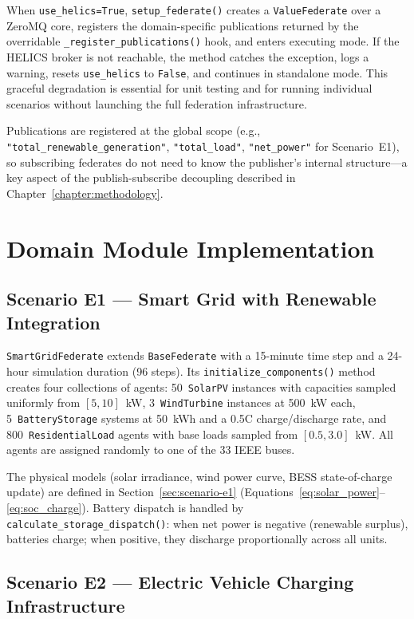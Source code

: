 When \texttt{use\_helics=True}, \texttt{setup\_federate()} creates a \texttt{ValueFederate} over a ZeroMQ core, registers the domain-specific publications returned by the overridable \texttt{\_register\_publications()} hook, and enters executing mode. If the HELICS broker is not reachable, the method catches the exception, logs a warning, resets \texttt{use\_helics} to \texttt{False}, and continues in standalone mode. This graceful degradation is essential for unit testing and for running individual scenarios without launching the full federation infrastructure.

Publications are registered at the global scope (e.g., \texttt{"total\_renewable\_generation"}, \texttt{"total\_load"}, \texttt{"net\_power"} for Scenario~E1), so subscribing federates do not need to know the publisher's internal structure---a key aspect of the publish-subscribe decoupling described in Chapter~\ref{chapter:methodology}.


\section{Domain Module Implementation}

\subsection{Scenario E1 --- Smart Grid with Renewable Integration}

\texttt{SmartGridFederate} extends \texttt{BaseFederate} with a 15-minute time step and a 24-hour simulation duration (96 steps). Its \texttt{initialize\_components()} method creates four collections of agents: 50~\texttt{SolarPV} instances with capacities sampled uniformly from $[5, 10]$~kW, 3~\texttt{WindTurbine} instances at 500~kW each, 5~\texttt{BatteryStorage} systems at 50~kWh and a 0.5C charge/discharge rate, and 800~\texttt{ResidentialLoad} agents with base loads sampled from $[0.5, 3.0]$~kW. All agents are assigned randomly to one of the 33 IEEE buses.

The physical models (solar irradiance, wind power curve, BESS state-of-charge update) are defined in Section~\ref{sec:scenario-e1} (Equations~\ref{eq:solar_power}--\ref{eq:soc_charge}). Battery dispatch is handled by \texttt{calculate\_storage\_dispatch()}: when net power is negative (renewable surplus), batteries charge; when positive, they discharge proportionally across all units.

\subsection{Scenario E2 --- Electric Vehicle Charging Infrastructure}

